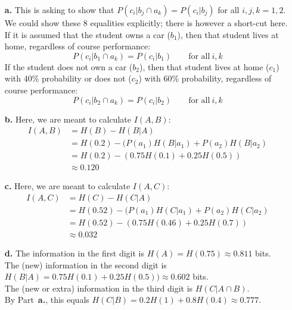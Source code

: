 \documentclass[11pt]{article}
\begin{document}
\begin{itemize}
  \item[{\bf a.}]
    This is asking to show that $P(c_i|b_j\cap a_k) = P(c_i|b_j)$ for all $i,j,k = 1,2$.\\
    We could show these 8 equalities explicitly; there is however a short-cut here.\\
    If it is assumed that the student owns a car ($b_1$),
    then that student lives at home, regardless of course performance:
      \[P(c_i|b_1\cap a_k) = P(c_i|b_1)\qquad\text{for all}\:i,k\]
    If the student does not own a car ($b_2$),
    then that student lives at home ($c_1$) with 40\% probability
                        or does not ($c_2$) with 60\% probability,
    regardless of course performance:
      \[P(c_i|b_2\cap a_k) = P(c_i|b_2)\qquad\text{for all}\:i,k\]
  \item[{\bf b.}] Here, we are meant to calculate $I(A,B)$:
    \begin{align*}
      I(A,B) &= H(B) - H(B|A)\\
             &= H(0.2) - (P(a_1)H(B|a_1) + P(a_2)H(B|a_2)\\
             &= H(0.2) - (0.75H(0.1) + 0.25H(0.5))\\
             &\approx 0.120
    \end{align*}
  \item[{\bf c.}] Here, we are meant to calculate $I(A,C)$:
    \begin{align*}
      I(A,C) &= H(C) - H(C|A)\\
             &= H(0.52) - (P(a_1)H(C|a_1) + P(a_2)H(C|a_2)\\
             &= H(0.52) - (0.75H(0.46) + 0.25H(0.7))\\
             &\approx 0.032
    \end{align*}
  \item[{\bf d.}]
  The information in the first digit is $H(A) = H(0.75)\approx 0.811$ bits.\\
  The (new) information in the second digit is $H(B|A) = 0.75H(0.1) + 0.25H(0.5))\approx 0.602$ bits.\\
  The (new or extra) information in the third digit is $H(C|A\cap B)$.\\
  By Part~{\bf a.}, this equals $H(C|B) = 0.2H(1)+0.8H(0.4)\approx0.777$.
\end{itemize}
\end{document}
